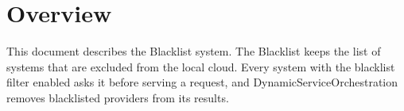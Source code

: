 \documentclass[a4paper]{arrowhead}
\begin{document}
\sloppy

\ArrowheadSetup

\begin{center}
  \vspace*{1cm}
  \huge{\arrowtitle}

  \vspace*{0.2cm}
  \LARGE{\arrowtype}
  \vspace*{1cm}

  \vspace*{\fill}


  \vspace*{1cm}
  \vspace*{\fill}

  \begin{abstract}
    This document describes the Blacklist support system of the Eclipse Arrowhead 5.2.2 framework, as implemented in \texttt{ah5-Blacklist-java-spring} of the primary Java source tree (\texttt{Eclipse-Arrowhead-java}) and deployed with the standalone Compose definition of that folder.
  \end{abstract}

  \vspace*{1cm}
\end{center}

\newpage

\tableofcontents
\newpage

\section{Overview}
\label{sec:overview}

This document describes the Blacklist system. The Blacklist keeps the list of systems that are excluded from the local cloud. Every system with the blacklist filter enabled asks it before serving a request, and Dynamic\allowbreak{}Service\allowbreak{}Orchestration removes blacklisted providers from its results.
\end{document}
